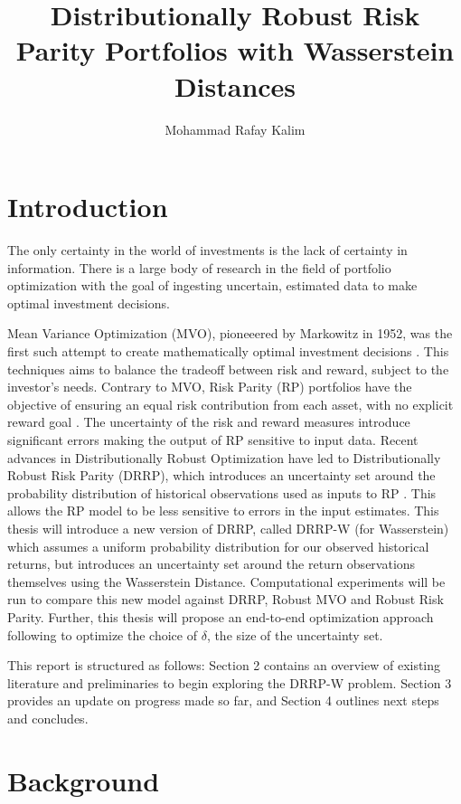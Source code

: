 \documentclass[12pt]{article}
\title{Distributionally Robust Risk Parity Portfolios with Wasserstein Distances}
\author{Mohammad Rafay Kalim }
\date{\vspace{-5ex}}
\begin{document}
\maketitle
\tableofcontents
\newpage
\section{Introduction}
The only certainty in the world of investments is the lack of certainty in information. There is a large body of research in the field of portfolio optimization with the goal of ingesting uncertain, estimated data to make optimal investment decisions. 


Mean Variance Optimization (MVO), pioneeered by Markowitz in 1952, was the first such attempt to create mathematically optimal investment decisions \cite{markowitz1952}. This techniques aims to balance the tradeoff between risk and reward, subject to the investor's needs. Contrary to MVO, Risk Parity (RP) portfolios have the objective of ensuring an equal risk contribution from each asset, with no explicit reward goal \cite{qian2011risk}.  The uncertainty of the risk and reward measures introduce significant errors making the output of RP sensitive to input data. Recent advances in Distributionally Robust Optimization have led to Distributionally Robust Risk Parity (DRRP), which introduces an uncertainty set around the probability distribution of historical observations used as inputs to RP \cite{costa2020robust}. This allows the RP model to be less sensitive to errors in the input estimates. This thesis will introduce a new version of DRRP, called DRRP-W (for Wasserstein) which assumes a uniform probability distribution for our observed historical returns, but introduces an uncertainty set around the return observations themselves using the Wasserstein Distance.  Computational experiments will be run to compare this new model against DRRP, Robust MVO and Robust Risk Parity. Further, this thesis will propose an end-to-end optimization approach following \cite{butler2023integrating} to optimize the choice of $\delta$, the size of the uncertainty set.

This report is structured as follows: Section 2 contains an overview of existing literature and preliminaries to begin exploring the DRRP-W problem. Section 3 provides an update on progress made so far, and Section 4 outlines next steps and concludes.
\newpage
\section{Background}
\end{document}
